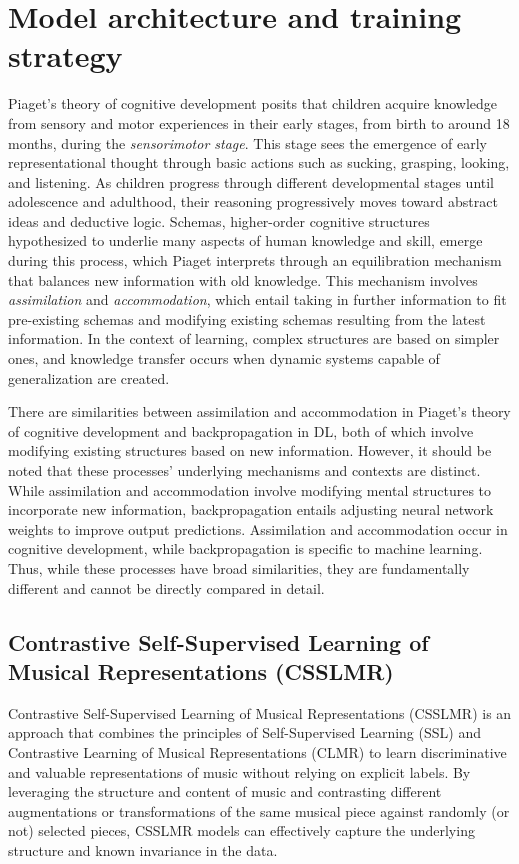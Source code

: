 \section{Model architecture and training strategy}
Piaget's theory of cognitive development \cite{Huitt2003PiagetsDevelopment} posits that children acquire knowledge from sensory and motor experiences in their early stages, from birth to around 18 months, during the \textit{sensorimotor stage}. This stage sees the emergence of early representational thought through basic actions such as sucking, grasping, looking, and listening. As children progress through different developmental stages until adolescence and adulthood, their reasoning progressively moves toward abstract ideas and deductive logic. Schemas, higher-order cognitive structures hypothesized to underlie many aspects of human knowledge and skill, emerge during this process, which Piaget interprets through an equilibration mechanism that balances new information with old knowledge. This mechanism involves \textit{assimilation} and \textit{accommodation}, which entail taking in further information to fit pre-existing schemas and modifying existing schemas resulting from the latest information. In the context of learning, complex structures are based on simpler ones, and knowledge transfer occurs when dynamic systems capable of generalization are created. \cite{audioselfsupsurvey}

There are similarities between assimilation and accommodation in Piaget's theory of cognitive development and backpropagation in DL, both of which involve modifying existing structures based on new information. However, it should be noted that these processes' underlying mechanisms and contexts are distinct. While assimilation and accommodation involve modifying mental structures to incorporate new information, backpropagation entails adjusting neural network weights to improve output predictions. Assimilation and accommodation occur in cognitive development, while backpropagation is specific to machine learning. Thus, while these processes have broad similarities, they are fundamentally different and cannot be directly compared in detail.

\subsection{Contrastive Self-Supervised Learning of Musical Representations (CSSLMR)}

Contrastive Self-Supervised Learning of Musical Representations (CSSLMR) is an approach that combines the principles of Self-Supervised Learning (SSL) \cite{audioselfsupsurvey} and Contrastive Learning of Musical Representations (CLMR) \cite{CLMR2021} to learn discriminative and valuable representations of music without relying on explicit labels. By leveraging the structure and content of music and contrasting different augmentations or transformations of the same musical piece against randomly (or not) selected pieces, CSSLMR models can effectively capture the underlying structure and known invariance in the data.

